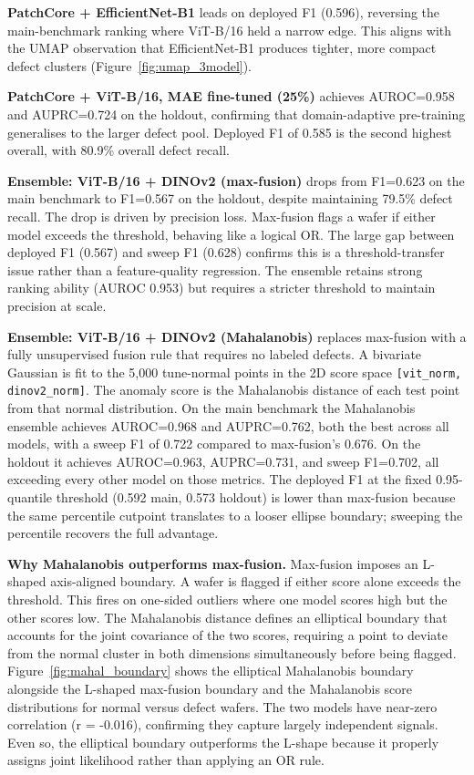 \documentclass[11pt]{article}
\begin{document}
\textbf{PatchCore + EfficientNet-B1} leads on deployed F1 (0.596), reversing the main-benchmark ranking
where ViT-B/16 held a narrow edge. This aligns with the UMAP observation that EfficientNet-B1 produces
tighter, more compact defect clusters (Figure~\ref{fig:umap_3model}).

\textbf{PatchCore + ViT-B/16, MAE fine-tuned (25\%)} achieves AUROC=0.958 and AUPRC=0.724
on the holdout, confirming that domain-adaptive pre-training generalises to the larger defect pool.
Deployed F1 of 0.585 is the second highest overall, with 80.9\% overall defect recall.

\textbf{Ensemble: ViT-B/16 + DINOv2 (max-fusion)} drops from F1=0.623 on the main benchmark to F1=0.567
on the holdout, despite maintaining 79.5\% defect recall. The drop is driven by precision loss.
Max-fusion flags a wafer if either model exceeds the threshold, behaving like a logical OR. The large gap between deployed F1 (0.567) and sweep F1 (0.628) confirms
this is a threshold-transfer issue rather than a feature-quality regression. The ensemble retains strong ranking ability (AUROC 0.953) but requires a stricter threshold to maintain precision at scale.

\textbf{Ensemble: ViT-B/16 + DINOv2 (Mahalanobis)} replaces max-fusion with a fully unsupervised fusion rule that requires no labeled defects. A bivariate Gaussian is fit to the 5{,}000 tune-normal points in the 2D score space \texttt{[vit\_norm, dinov2\_norm]}. The anomaly score is the Mahalanobis distance of each test point from that normal distribution. On the main benchmark the Mahalanobis ensemble achieves AUROC=0.968 and AUPRC=0.762, both the best across all models, with a sweep F1 of 0.722 compared to max-fusion's 0.676. On the holdout it achieves AUROC=0.963, AUPRC=0.731, and sweep F1=0.702, all exceeding every other model on those metrics. The deployed F1 at the fixed 0.95-quantile threshold (0.592 main, 0.573 holdout) is lower than max-fusion because the same percentile cutpoint translates to a looser ellipse boundary; sweeping the percentile recovers the full advantage.

\textbf{Why Mahalanobis outperforms max-fusion.} Max-fusion imposes an L-shaped axis-aligned boundary. A wafer is flagged if either score alone exceeds the threshold. This fires on one-sided outliers where one model scores high but the other scores low. The Mahalanobis distance defines an elliptical boundary that accounts for the joint covariance of the two scores, requiring a point to deviate from the normal cluster in both dimensions simultaneously before being flagged. Figure~\ref{fig:mahal_boundary} shows the elliptical Mahalanobis boundary alongside the L-shaped max-fusion boundary and the Mahalanobis score distributions for normal versus defect wafers. The two models have near-zero correlation (r = -0.016), confirming they capture largely independent signals. Even so, the elliptical boundary outperforms the L-shape because it properly assigns joint likelihood rather than applying an OR rule.
\end{document}
